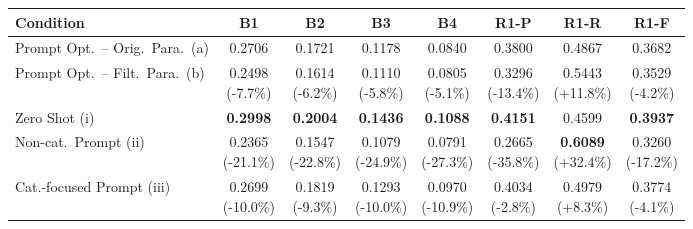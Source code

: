 \documentclass{article} %
\begin{document}
\begin{table}[t]
\centering
\scriptsize
\renewcommand{\arraystretch}{0.95}

\begin{subtable}{\linewidth}
\centering
{}
\begin{adjustbox}{max width=0.9\textwidth}
\begin{tabular}{lccccccc}
\toprule
\textbf{Condition} & B1 & B2 & B3 & B4 & R1-P & R1-R & R1-F \\
\midrule
Prompt Opt.\ -- Orig.\ Para.\ (a) & 0.2706 & 0.1721 & 0.1178 & 0.0840 & 0.3800 & 0.4867 & 0.3682 \\
Prompt Opt.\ -- Filt.\ Para.\ (b) & \makecell{0.2498 \\ (-7.7\%)} & \makecell{0.1614 \\ (-6.2\%)} 
& \makecell{0.1110 \\ (-5.8\%)} & \makecell{0.0805 \\ (-5.1\%)} 
& \makecell{0.3296 \\ (-13.4\%)} & \makecell{0.5443\textbf{ }\\ (+11.8\%)} 
& \makecell{0.3529 \\ (-4.2\%)} \\
\midrule
Zero Shot (i)       & \textbf{0.2998} & \textbf{0.2004} & \textbf{0.1436} & \textbf{0.1088} & \textbf{0.4151} & 0.4599 & \textbf{0.3937} \\
Non-cat.\ Prompt (ii) & \makecell{0.2365 \\ (-21.1\%)} & \makecell{0.1547 \\ (-22.8\%)} 
& \makecell{0.1079 \\ (-24.9\%)} & \makecell{0.0791 \\ (-27.3\%)} 
& \makecell{0.2665 \\ (-35.8\%)} & \makecell{\textbf{0.6089} \\ (+32.4\%)} 
& \makecell{0.3260 \\ (-17.2\%)} \\
Cat.-focused Prompt (iii) & \makecell{0.2699 \\ (-10.0\%)} & \makecell{0.1819 \\ (-9.3\%)} 
& \makecell{0.1293 \\ (-10.0\%)} & \makecell{0.0970 \\ (-10.9\%)} 
& \makecell{0.4034 \\ (-2.8\%)}  & \makecell{0.4979 \\ (+8.3\%)} 
& \makecell{0.3774 \\ (-4.1\%)} \\
\bottomrule
\end{tabular}
\end{adjustbox}
\end{subtable}


\end{table}
\end{document}
